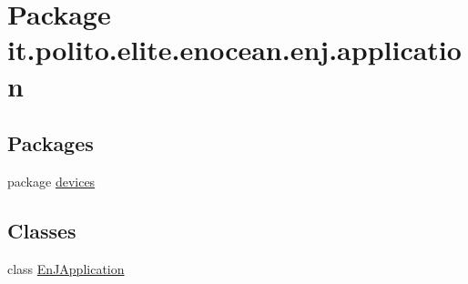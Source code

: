 \hypertarget{namespaceit_1_1polito_1_1elite_1_1enocean_1_1enj_1_1application}{}\section{Package it.\+polito.\+elite.\+enocean.\+enj.\+application}
\label{namespaceit_1_1polito_1_1elite_1_1enocean_1_1enj_1_1application}
\subsection*{Packages}
\begin{DoxyCompactItemize}
\item 
package \hyperlink{namespaceit_1_1polito_1_1elite_1_1enocean_1_1enj_1_1application_1_1devices}{devices}
\end{DoxyCompactItemize}
\subsection*{Classes}
\begin{DoxyCompactItemize}
\item 
class \hyperlink{classit_1_1polito_1_1elite_1_1enocean_1_1enj_1_1application_1_1_en_j_application}{En\+J\+Application}
\end{DoxyCompactItemize}
